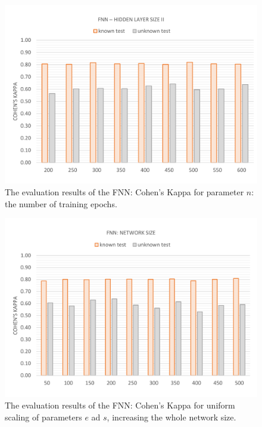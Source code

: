 \vspace{-11mm}
\begin{figure}[H]
	\centering\includegraphics[width=\textwidth]{images/evaluation_fnn_s2_k}
	\caption[FNN Evaluation: Number of Training Epochs]{The evaluation results of the FNN: Cohen's Kappa for parameter $n$: the number of training epochs.}
	\label{f.evaluation.fnn.s2.k}
\end{figure}

\vspace{-11mm}
\begin{figure}[H]
	\centering\includegraphics[width=\textwidth]{images/evaluation_fnn_es_k}
	\caption[FNN Evaluation: Network Size]{The evaluation results of the FNN: Cohen's Kappa for uniform scaling of parameters $e$ ad $s$, increasing the whole network size.}
	\label{f.evaluation.fnn.es.k}
\end{figure}

